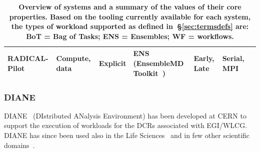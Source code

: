 \documentclass{sig-alternate}
\begin{document}
\begin{table}
\begin{tabular}{p{2.5cm}p{2.25cm}p{2cm}p{5cm}p{1.75cm}p{1.75cm}p{1.75cm}|}
    RADICAL-Pilot &
    Compute, data &
    Explicit &
    ENS (EnsembleMD Toolkit~\cite{emdtoolkit_url}) &
    Early, Late &
    Serial, MPI \\

 \bottomrule

 \end{tabular}
 \caption{\textbf{Overview of \pilot systems and a summary of the values of
 their core properties. Based on the tooling currently available for each \pilot system, the types of workload supported as defined in~\S\ref{sec:termsdefs} are: BoT = Bag of Tasks; ENS = Ensembles; WF = workflows.} }
 \label{table:implementations-properties}
\end{table}





%
\subsubsection{DIANE}\label{sec:diane}

DIANE~\cite{moscicki2003diane} (DIstributed ANalysis Environment) has been
developed at CERN to support the execution of workloads for the DCRs associated
with EGI/WLCG. DIANE has since been used also in the Life
Sciences~\cite{moscicki2004biomedical,jacq2007virtual,moscicki2003} and in few
other scientific domains~\cite{bacu2011gswat,mantero2003simulation}.
\end{document}
